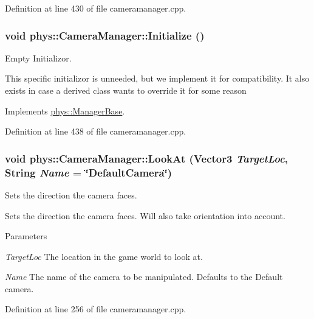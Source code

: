 Definition at line 430 of file cameramanager.cpp.

\hypertarget{classphys_1_1CameraManager_a5e956b61fa341ae576d8d160da518488}{
\subsubsection[{Initialize}]{\setlength{\rightskip}{0pt plus 5cm}void phys::CameraManager::Initialize ()}}
\label{d9/d91/classphys_1_1CameraManager_a5e956b61fa341ae576d8d160da518488}


Empty Initializor. 

This specific initializor is unneeded, but we implement it for compatibility. It also exists in case a derived class wants to override it for some reason 

Implements \hyperlink{classphys_1_1ManagerBase_a57dd8e54e767427d5bdcc86dc66d73ed}{phys::ManagerBase}.



Definition at line 438 of file cameramanager.cpp.

\hypertarget{classphys_1_1CameraManager_a885a499a53c3543b6bf429583a2cb54c}{
\subsubsection[{LookAt}]{\setlength{\rightskip}{0pt plus 5cm}void phys::CameraManager::LookAt ({\bf Vector3} {\em TargetLoc}, \/  {\bf String} {\em Name} = {\ttfamily \char`\"{}DefaultCamera\char`\"{}})}}
\label{d9/d91/classphys_1_1CameraManager_a885a499a53c3543b6bf429583a2cb54c}


Sets the direction the camera faces. 

Sets the direction the camera faces. Will also take orientation into account. 
\begin{DoxyParams}{Parameters}
\item[{\em TargetLoc}]The location in the game world to look at. \item[{\em Name}]The name of the camera to be manipulated. Defaults to the Default camera. \end{DoxyParams}


Definition at line 256 of file cameramanager.cpp.

